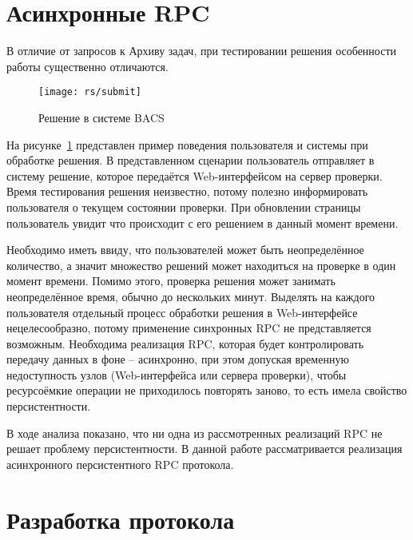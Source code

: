 \section{Асинхронные RPC}
В отличие от запросов к Архиву задач, при тестировании решения особенности
работы существенно отличаются.

\begin{figure}[H]
    \centering
    \texttt{[image: rs/submit]}
    \caption{Решение в системе BACS}
    \label{fig:submit}
\end{figure}

На рисунке~\ref{fig:submit} представлен пример поведения пользователя
и системы при обработке решения. В представленном сценарии пользователь
отправляет в систему решение, которое передаётся Web-интерфейсом
на сервер проверки. Время тестирования решения неизвестно, потому
полезно информировать пользователя о текущем состоянии проверки.
При обновлении страницы пользователь увидит что происходит с его
решением в данный момент времени.

Необходимо иметь ввиду, что пользователей может быть неопределённое количество,
а значит множество решений может находиться на проверке в один момент времени.
Помимо этого, проверка решения может занимать неопределённое время,
обычно до нескольких минут. Выделять на каждого пользователя отдельный
процесс обработки решения в Web-интерфейсе нецелесообразно,
потому применение синхронных RPC не представляется возможным.
Необходима реализация RPC, которая будет контролировать передачу данных
в фоне -- асинхронно, при этом допуская временную недоступность узлов
(Web-интерфейса или сервера проверки), чтобы ресурсоёмкие операции
не приходилось повторять заново, то есть имела свойство персистентности.

В ходе анализа показано, что ни одна из рассмотренных реализаций RPC
не решает проблему персистентности. В данной работе рассматривается
реализация асинхронного персистентного RPC протокола.

\section{Разработка протокола}
